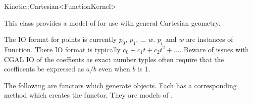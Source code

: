 

\begin{ccRefClass}{Kinetic::Cartesian<FunctionKernel>}  %


\ccDefinition
  
This class provides a model of  for use with general Cartesian geometry.

The IO format for points is currently $p_0$, $p_1$, ... $w$. $p_i$ and $w$ are instances of Function. There IO format is typically $c_0+c_1t+c_2t^2+...$. Beware of issues with CGAL IO of the coeffients as exact number typles often require that the coefficents be expressed as $a/b$ even when $b$ is 1.


\ccTypes






The following are functors which generate  objects. Each has a corresponding  method which creates the functor. They are models of .








\end{ccRefClass}
